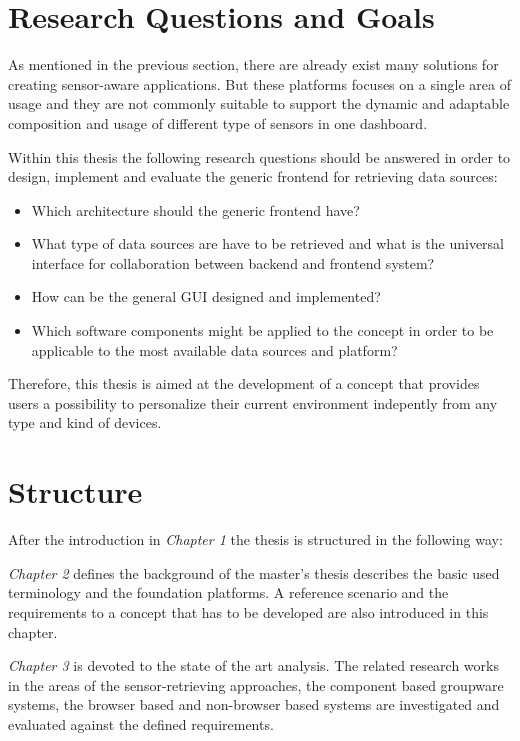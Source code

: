 \section{Research Questions and Goals}
       As mentioned in the previous section, there are already exist many solutions for creating sensor-aware applications. But these platforms focuses on a single area of usage and they are not commonly suitable to support the dynamic and adaptable composition and usage of different type of sensors in one dashboard.

       Within this thesis the following research questions should be answered in order to design, implement and evaluate the generic frontend for retrieving data sources: 
       \begin{itemize}
       \item Which architecture should the generic frontend have?
       \item What type of data sources are have to be retrieved and what is the universal interface for collaboration between backend and frontend system?
       \item How can be the general GUI designed and implemented?
       \item Which software components might be applied to the concept in order to be applicable to the most available data sources and platform?
       \end{itemize}

     Therefore, this thesis is aimed at the development of a concept that provides users a possibility to personalize their current environment indepently from any type and kind of devices.

\section{Structure}

After the introduction in \emph{Chapter 1} the thesis is structured in the following way:

\emph{Chapter 2} defines the background of the master’s thesis describes the basic used terminology and the foundation platforms. A reference scenario and the requirements to a concept that has to be developed are also introduced in this chapter.

\emph{Chapter 3} is devoted to the state of the art analysis. The related research works in the areas of the sensor-retrieving approaches, the component based groupware systems, the browser based and non-browser based systems are investigated and evaluated against the defined requirements.

